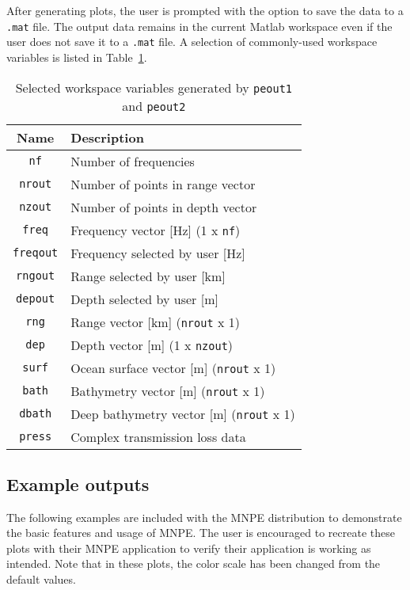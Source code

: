 After generating plots, the user is prompted with the option to save the data to a \texttt{.mat} file. The output data remains in the current Matlab workspace even if the user does not save it to a \texttt{.mat} file. A selection of commonly-used workspace variables is listed in Table~\ref{tab:peoutdata}.

\begin{table}[!ht]
	\begin{center}
		\caption{Selected workspace variables generated by \texttt{peout1} and \texttt{peout2}}
		\label{tab:peoutdata}
		\begin{tabular}{c|l} 
			\textbf{Name} & \textbf{Description}\\
			\hline
			\texttt{nf} & Number of frequencies \\
			\texttt{nrout} & Number of points in range vector \\
			\texttt{nzout} & Number of points in depth vector \\
			\texttt{freq} & Frequency vector [Hz] (1 x \texttt{nf})\\
			\texttt{freqout} & Frequency selected by user [Hz] \\
			\texttt{rngout} & Range selected by user [km] \\
			\texttt{depout} & Depth selected by user [m] \\
			\texttt{rng} & Range vector [km] (\texttt{nrout}  x 1)\\
			\texttt{dep} & Depth vector [m] (1 x \texttt{nzout})\\
			\texttt{surf} & Ocean surface vector [m] (\texttt{nrout}  x 1)\\
			\texttt{bath} & Bathymetry vector [m] (\texttt{nrout}  x 1)\\
			\texttt{dbath} & Deep bathymetry vector [m] (\texttt{nrout}  x 1)\\
			\texttt{press} & Complex transmission loss data \\
		\end{tabular}
	\end{center}
\end{table}

\subsection{Example outputs}

The following examples are included with the MNPE distribution to demonstrate the basic features and usage of MNPE. The user is encouraged to recreate these plots with their MNPE application to verify their application is working as intended. Note that in these plots, the color scale has been changed from the default values.

